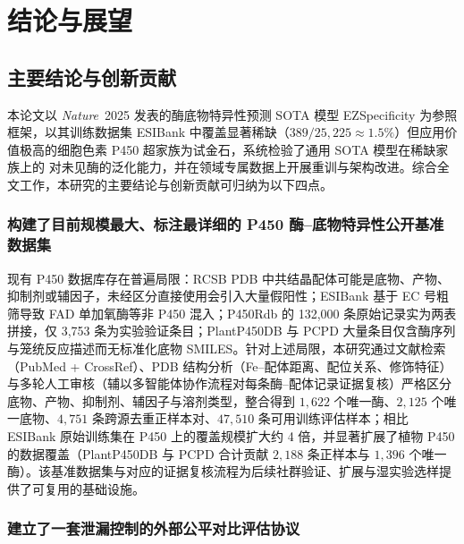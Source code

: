
\chapter{结论与展望}
\label{cha:conclusion}

\section{主要结论与创新贡献}
\label{sec:contributions}

本论文以 \textit{Nature}~2025 发表的酶底物特异性预测 SOTA 模型 EZSpecificity\cite{EZSpec2025} 为参照框架，以其训练数据集 ESIBank 中覆盖显著稀缺（$389/25{,}225 \approx 1.5\%$）但应用价值极高的细胞色素 P450 超家族为试金石，系统检验了通用 SOTA 模型在稀缺家族上的 对未见酶的泛化能力，并在领域专属数据上开展重训与架构改进。综合全文工作，本研究的主要结论与创新贡献可归纳为以下四点。

\subsection{构建了目前规模最大、标注最详细的 P450 酶--底物特异性公开基准数据集}
\label{subsec:contrib-dataset}

现有 P450 数据库存在普遍局限：RCSB PDB\cite{Burley2025,Berman2000} 中共结晶配体可能是底物、产物、抑制剂或辅因子，未经区分直接使用会引入大量假阳性；ESIBank\cite{EZSpec2025} 基于 EC 号粗筛导致 FAD 单加氧酶等非 P450 混入；P450Rdb 的 132{,}000 条原始记录实为两表拼接，仅 3{,}753 条为实验验证条目；PlantP450DB\cite{Nelson2004} 与 PCPD\cite{Wang2021PCPD} 大量条目仅含酶序列与笼统反应描述而无标准化底物 SMILES。针对上述局限，本研究通过文献检索（PubMed + CrossRef）、PDB 结构分析（Fe--配体距离、配位关系、修饰特征）与多轮人工审核（辅以多智能体协作流程对每条酶--配体记录证据复核）严格区分底物、产物、抑制剂、辅因子与溶剂类型，整合得到 $1{,}622$ 个唯一酶、$2{,}125$ 个唯一底物、$4{,}751$ 条跨源去重正样本对、$47{,}510$ 条可用训练评估样本；相比 ESIBank 原始训练集在 P450 上的覆盖规模扩大约 4 倍，并显著扩展了植物 P450 的数据覆盖（PlantP450DB 与 PCPD 合计贡献 $2{,}188$ 条正样本与 $1{,}396$ 个唯一酶）。该基准数据集与对应的证据复核流程为后续社群验证、扩展与湿实验选样提供了可复用的基础设施。

\subsection{建立了一套泄漏控制的外部公平对比评估协议}
\label{subsec:contrib-protocol}

